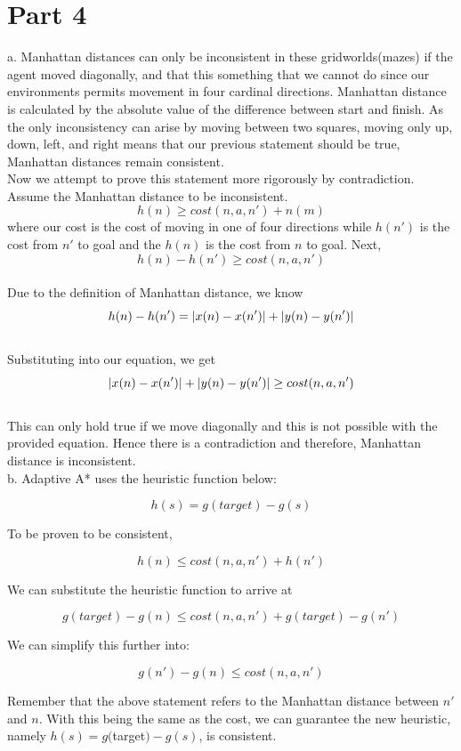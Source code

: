 \documentclass{article}
\begin{document}
\section*{Part 4}

a. Manhattan distances can only be inconsistent in these gridworlds(mazes) if the agent moved diagonally, and that this something that we cannot do since our environments permits movement in four cardinal directions. Manhattan distance is calculated by the absolute value of the difference between start and finish. As the only inconsistency can arise by moving between two squares, moving only up, down, left, and right means that our previous statement should be true, Manhattan distances remain consistent.
\\Now we attempt to prove this statement more rigorously by contradiction.
\newline
\\Assume the Manhattan distance to be inconsistent.
\[h(n) \geq cost (n,a,n')+n(m)\]
where our cost is the cost of moving in one of four directions while $h(n')$ is the cost from $n'$ to goal and the $h(n)$ is the cost from $n$ to goal. Next,
\[h(n)-h(n') \geq cost(n,a,n')\]
\\Due to the definition of Manhattan distance, we know
\[h(n)-h(n')=\abs{x(n)-x(n')}+\abs{y(n)-y(n')}\]
\\Substituting into our equation, we get
\[\abs{x(n)-x(n')}+\abs{y(n)-y(n')} \geq cost(n,a,n')\]
\\This can only hold true if we move diagonally and this is not possible with the provided equation. Hence there is a contradiction and therefore, Manhattan distance is inconsistent.
\\b. Adaptive A* uses the heuristic function below:

\[h(s)=g(target)-g(s)\]

To be proven to be consistent,

\[h(n) \leq cost (n,a,n')+h(n')\]

We can substitute the heuristic function to arrive at

\[g(target)-g(n) \leq cost(n,a,n')+g(target)-g(n')\]

We can simplify this further into:

\[g(n')-g(n) \leq cost(n,a,n')\]

Remember that the above statement refers to the Manhattan distance between $n'$ and $n$. With this being the same as the cost, we can guarantee the new heuristic, namely $h(s)=g($target$)-g(s)$, is consistent.
\end{document}

